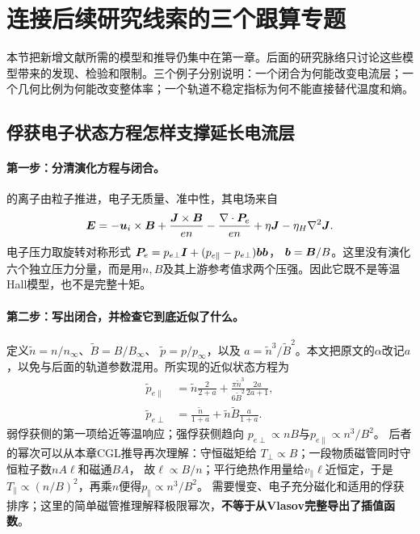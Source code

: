 \section{连接后续研究线索的三个跟算专题}
本节把新增文献所需的模型和推导仍集中在第一章。后面的研究脉络只讨论这些模型带来的发现、检验和限制。三个例子分别说明：一个闭合为何能改变电流层；一个几何比例为何能改变整体率；一个轨道不稳定指标为何不能直接替代温度和熵。

\subsection{俘获电子状态方程怎样支撑延长电流层}\label{sec:synthesis-closure-model}
\paragraph{第一步：分清演化方程与闭合。}
\citet{F611}的离子由粒子推进，电子无质量、准中性，其电场来自
\begin{equation}
\bm{E}=-\bm{u}_i\times\bm{B}+\frac{\bm{J}\times\bm{B}}{en}
-\frac{\nabla\cdot\bm{P}_e}{en}
+\eta\bm{J}-\eta_H\nabla^2\bm{J} .
\end{equation}
电子压力取旋转对称形式
$\bm{P}_e=p_{e\perp}\bm{I}+(p_{e\parallel}-p_{e\perp})\bm{b}\bm{b}$，
$\bm{b}=\bm{B}/B$。这里没有演化六个独立压力分量，而是用$n,B$及其上游参考值求两个压强。因此它既不是等温Hall模型，也不是完整十矩。

\paragraph{第二步：写出闭合，并检查它到底近似了什么。}
定义$\widetilde n=n/n_\infty$、$\widetilde B=B/B_\infty$、
$\widetilde p=p/p_\infty$，以及
$a=\widetilde n^3/\widetilde B^2$。本文把原文的$\alpha$改记$a$，以免与后面的轨道参数混用。所实现的近似状态方程为
\begin{align}
\widetilde p_{e\parallel}
 &=\widetilde n\frac{2}{2+a}
   +\frac{\pi\widetilde n^3}{6\widetilde B^2}
      \frac{2a}{2a+1},\label{eq:synthesis-eos-par}\\
\widetilde p_{e\perp}
 &=\frac{\widetilde n}{1+a}
   +\widetilde n\widetilde B\frac{a}{1+a}.
\end{align}
弱俘获侧的第一项给近等温响应；强俘获侧趋向
$p_{e\perp}\propto nB$与$p_{e\parallel}\propto n^3/B^2$。
后者的幂次可以从本章CGL推导再次理解：守恒磁矩给
$T_\perp\propto B$；一段物质磁管同时守恒粒子数$nA\ell$和磁通$BA$，
故$\ell\propto B/n$；平行绝热作用量给$v_\parallel\ell$近恒定，于是
$T_\parallel\propto(n/B)^2$，再乘$n$便得$p_\parallel\propto n^3/B^2$。
需要慢变、电子充分磁化和适用的俘获排序；这里的简单磁管推理解释极限幂次，\textbf{不等于从Vlasov完整导出了插值函数}。

